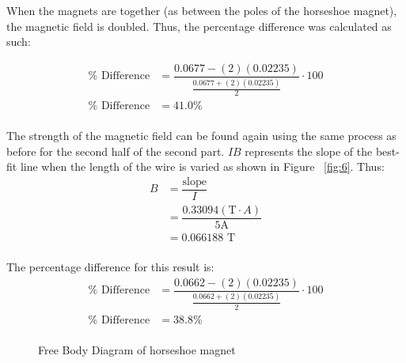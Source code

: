 \documentclass [12pt, letterpaper, twoside]{article}
\begin{document}
\noindent
When the magnets are together (as between the poles of the horseshoe magnet), the magnetic field is doubled. Thus, the percentage difference was calculated as such:

\begin{equation*}
  \begin{split}
    \%\text{ Difference} &= \dfrac{0.0677 - (2)(0.02235)}{\tfrac{0.0677 + (2)(0.02235)}{2}}\cdot{100} \\
    \%\text{ Difference} &= 41.0\% \\ %
  \end{split}
\end{equation*}

\noindent
The strength of the magnetic field can be found again using the same process as before for the second half of the second part. \(IB\) represents the slope of the best-fit line when the length of the wire is varied as shown in Figure ~\ref{fig:6}. Thus:
\begin{equation*}
  \begin{split}
    B &= \dfrac{\text{slope}}{I} \\
      &= \dfrac{0.33094(\text{T}\cdot{A})}{5\text{A}} \\  
      &= 0.066188\text{ T} \\
  \end{split}
\end{equation*}

\noindent
The percentage difference for this result is:
\begin{equation*}
  \begin{split}
    \%\text{ Difference} &= \dfrac{0.0662 - (2)(0.02235)}{\tfrac{0.0662 + (2)(0.02235)}{2}}\cdot{100} \\
    \%\text{ Difference} &= 38.8\% \\ %
  \end{split}
\end{equation*}

\begin{figure}
  \centering
  \caption{Free Body Diagram of horseshoe magnet}
  \label{fig:4}
\end{figure}
\end{document}
